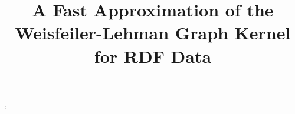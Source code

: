 \documentclass{beamer}
\title{A Fast Approximation of the Weisfeiler-Lehman Graph Kernel for RDF Data}
\begin{document}
:
	\begin{frame}
		\titlepage
	\end{frame}
\end{document}
